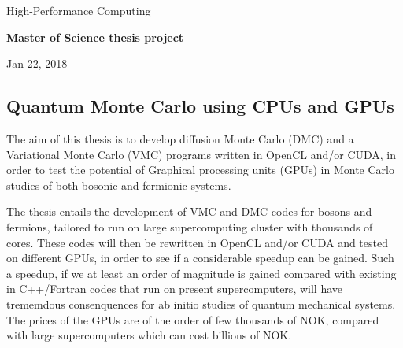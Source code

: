 \documentclass[%
oneside,                 %
final,                   %
10pt]{article}
\begin{document}

\newcommand{\exercisesection}[1]{\subsection*{#1}}






\thispagestyle{empty}

\begin{center}
{\LARGE\bf
\begin{spacing}{1.25}
High-Performance Computing 
\end{spacing}
}
\end{center}


\begin{center}
{\bf Master of Science thesis project${}^{}$} \\ [0mm]
\end{center}

\begin{center}
\end{center}
    

\begin{center}
Jan 22, 2018
\end{center}

\vspace{1cm}


\subsection*{Quantum Monte Carlo using CPUs and GPUs}

The aim of this thesis is to develop  diffusion Monte Carlo (DMC) and a Variational
Monte Carlo (VMC) programs written in OpenCL and/or CUDA, in order to test the potential
of Graphical processing units (GPUs) in Monte Carlo studies of both bosonic and fermionic systems.

The thesis entails the development of  VMC and DMC codes for bosons and fermions,
tailored to run on large supercomputing cluster with thousands of cores.
These codes will then be rewritten in OpenCL and/or CUDA and tested on different GPUs,
in order to see if a considerable speedup can be gained.
Such a speedup, if we at least an order of magnitude is gained compared 
with existing in C++/Fortran codes that run on present  supercomputers, will have trememdous consenquences for ab initio studies of quantum mechanical systems.  The prices of the GPUs are of the order of few thousands of NOK, compared
with large supercomputers which can cost billions of NOK. 
\end{document}
